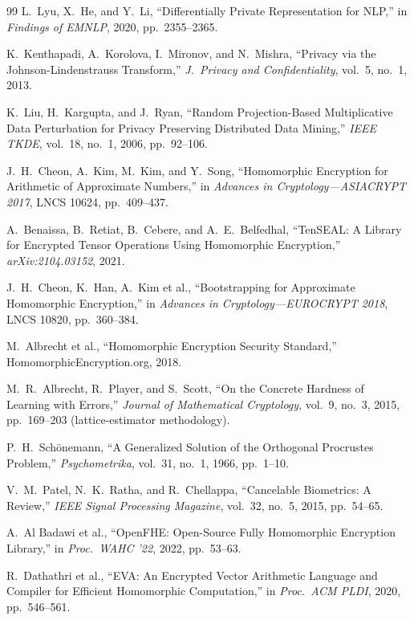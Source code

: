 \begin{thebibliography}{99}
 L.\ Lyu, X.\ He, and Y.\ Li, ``Differentially Private
Representation for NLP,'' in \emph{Findings of EMNLP}, 2020,
pp.\ 2355--2365.

 K.\ Kenthapadi, A.\ Korolova, I.\ Mironov, and
N.\ Mishra, ``Privacy via the Johnson-Lindenstrauss Transform,''
\emph{J.\ Privacy and Confidentiality}, vol.\ 5, no.\ 1, 2013.

 K.\ Liu, H.\ Kargupta, and J.\ Ryan,
``Random Projection-Based Multiplicative Data Perturbation for Privacy
Preserving Distributed Data Mining,'' \emph{IEEE TKDE}, vol.\ 18,
no.\ 1, 2006, pp.\ 92--106.

 J.\ H.\ Cheon, A.\ Kim, M.\ Kim, and Y.\ Song,
``Homomorphic Encryption for Arithmetic of Approximate Numbers,'' in
\emph{Advances in Cryptology---ASIACRYPT 2017}, LNCS 10624, pp.\ 409--437.

 A.\ Benaissa, B.\ Retiat, B.\ Cebere, and A.\ E.\
Belfedhal, ``TenSEAL: A Library for Encrypted Tensor Operations Using
Homomorphic Encryption,'' \emph{arXiv:2104.03152}, 2021.

 J.\ H.\ Cheon, K.\ Han, A.\ Kim et al.,
``Bootstrapping for Approximate Homomorphic Encryption,'' in
\emph{Advances in Cryptology---EUROCRYPT 2018}, LNCS 10820,
pp.\ 360--384.

 M.\ Albrecht et al., ``Homomorphic Encryption
Security Standard,'' HomomorphicEncryption.org, 2018.

 M.\ R.\ Albrecht, R.\ Player, and S.\ Scott,
``On the Concrete Hardness of Learning with Errors,'' \emph{Journal of
Mathematical Cryptology}, vol.\ 9, no.\ 3, 2015, pp.\ 169--203
(lattice-estimator methodology).

 P.\ H.\ Sch\"onemann, ``A Generalized Solution
of the Orthogonal Procrustes Problem,'' \emph{Psychometrika}, vol.\ 31,
no.\ 1, 1966, pp.\ 1--10.

 V.\ M.\ Patel, N.\ K.\ Ratha, and R.\ Chellappa,
``Cancelable Biometrics: A Review,'' \emph{IEEE Signal Processing
Magazine}, vol.\ 32, no.\ 5, 2015, pp.\ 54--65.

 A.\ Al Badawi et al., ``OpenFHE: Open-Source Fully
Homomorphic Encryption Library,'' in \emph{Proc.\ WAHC '22},
2022, pp.\ 53--63.

 R.\ Dathathri et al., ``EVA: An Encrypted Vector
Arithmetic Language and Compiler for Efficient Homomorphic
Computation,'' in \emph{Proc.\ ACM PLDI}, 2020, pp.\ 546--561.


\end{thebibliography}
